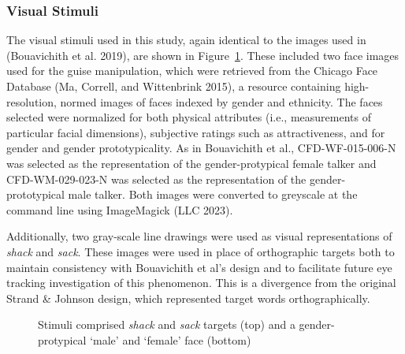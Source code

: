 \documentclass[
  letterpaper,
  DIV=11,
  numbers=noendperiod]{scrartcl}
\begin{document}
\subsubsection{Visual Stimuli}\label{sec-stimuli-visual}

The visual stimuli used in this study, again identical to the images
used in (Bouavichith et al. 2019), are shown in Figure~\ref{fig-visual}.
These included two face images used for the guise manipulation, which
were retrieved from the Chicago Face Database (Ma, Correll, and
Wittenbrink 2015), a resource containing high-resolution, normed images
of faces indexed by gender and ethnicity. The faces selected were
normalized for both physical attributes (i.e., measurements of
particular facial dimensions), subjective ratings such as
attractiveness, and for gender and gender prototypicality. As in
Bouavichith et al., CFD-WF-015-006-N was selected as the representation
of the gender-protypical female talker and CFD-WM-029-023-N was selected
as the representation of the gender-prototypical male talker. Both
images were converted to greyscale at the command line using ImageMagick
(LLC 2023).

Additionally, two gray-scale line drawings were used as visual
representations of \emph{shack} and \emph{sack}. These images were used
in place of orthographic targets both to maintain consistency with
Bouavichith et al's design and to facilitate future eye tracking
investigation of this phenomenon. This is a divergence from the original
Strand \& Johnson design, which represented target words
orthographically.

\begin{figure}


\caption{\label{fig-visual}Stimuli comprised \emph{shack} and
\emph{sack} targets (top) and a gender-protypical `male' and `female'
face (bottom)}

\end{figure}%
\end{document}

